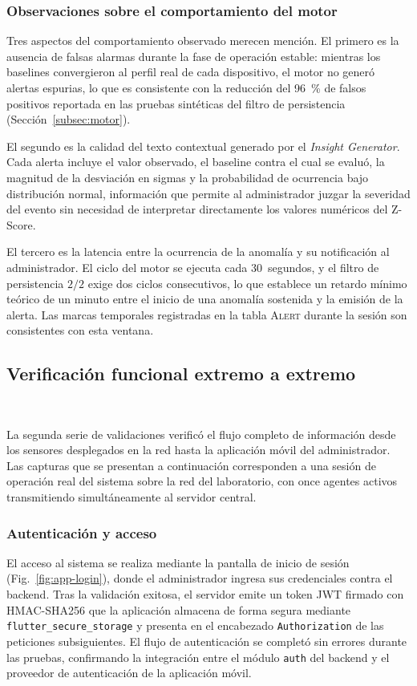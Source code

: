 \subsubsection{Observaciones sobre el comportamiento del motor}

Tres aspectos del comportamiento observado merecen mención. El
primero es la ausencia de falsas alarmas durante la fase de
operación estable: mientras los baselines convergieron al perfil
real de cada dispositivo, el motor no generó alertas espurias, lo
que es consistente con la reducción del 96~\% de falsos positivos
reportada en las pruebas sintéticas del filtro de persistencia
(Sección~\ref{subsec:motor}).

El segundo es la calidad del texto contextual generado por el
\textit{Insight Generator}. Cada alerta incluye el valor
observado, el baseline contra el cual se evaluó, la magnitud de
la desviación en sigmas y la probabilidad de ocurrencia bajo
distribución normal, información que permite al administrador
juzgar la severidad del evento sin necesidad de interpretar
directamente los valores numéricos del Z-Score.

El tercero es la latencia entre la ocurrencia de la anomalía y su
notificación al administrador. El ciclo del motor se ejecuta cada
30~segundos, y el filtro de persistencia $2/2$ exige dos ciclos
consecutivos, lo que establece un retardo mínimo teórico de un
minuto entre el inicio de una anomalía sostenida y la emisión de
la alerta. Las marcas temporales registradas en la tabla
\textsc{Alert} durante la sesión son consistentes con esta
ventana.

\subsection{Verificación funcional extremo a extremo}
~\label{subsec:res-e2e}

La segunda serie de validaciones verificó el flujo completo de
información desde los sensores desplegados en la red hasta la
aplicación móvil del administrador. Las capturas que se presentan
a continuación corresponden a una sesión de operación real del
sistema sobre la red del laboratorio, con once agentes activos
transmitiendo simultáneamente al servidor central.

\subsubsection{Autenticación y acceso}

El acceso al sistema se realiza mediante la pantalla de inicio de
sesión (Fig.~\ref{fig:app-login}), donde el administrador ingresa
sus credenciales contra el backend. Tras la validación exitosa, el
servidor emite un token JWT firmado con HMAC-SHA256 que la
aplicación almacena de forma segura mediante
\texttt{flutter\_secure\_storage} y presenta en el encabezado
\texttt{Authorization} de las peticiones subsiguientes. El flujo
de autenticación se completó sin errores durante las pruebas,
confirmando la integración entre el módulo \texttt{auth} del
backend y el proveedor de autenticación de la aplicación móvil.

